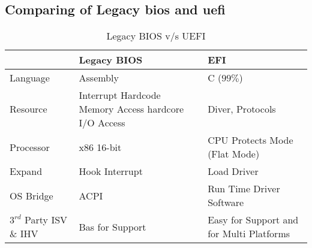 \subsection{Comparing of Legacy \gls{bios} and \gls{uefi}}

\begin{table}
	\centering
	\renewcommand{\arraystretch}{2}
	\caption{Legacy BIOS v/s UEFI}\label{table:legacy-bios-vs-uefi}
	\begin{tabular}{l | p{5cm} | p{5cm}}
		& Legacy BIOS & EFI
		\\ \hline \hline
		Language & Assembly & C ($ 99\% $)
		\\ \hline
		Resource & Interrupt Hardcode Memory Access hardcore I/O Access & Diver, Protocols
		\\ \hline
		Processor & x86 16-bit & CPU Protects Mode (Flat Mode)
		\\ \hline
		Expand & Hook Interrupt & Load Driver
		\\ \hline
		OS Bridge & ACPI & Run Time Driver Software
		\\ \hline
		$ 3^{rd} $ Party ISV \& IHV & Bas for Support & Easy for Support and for Multi Platforms
		\\ \hline
	\end{tabular}
\end{table}



